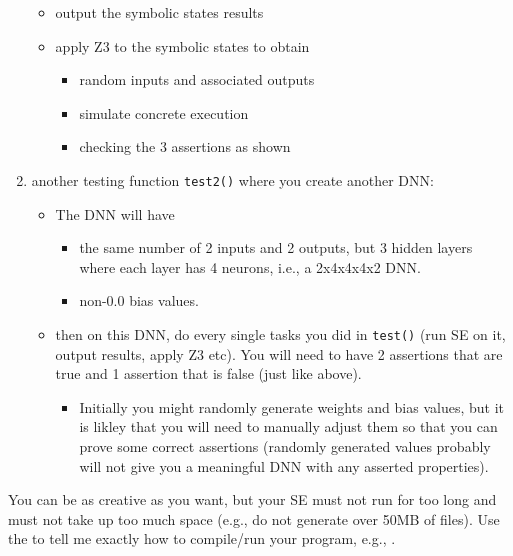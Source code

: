 \begin{enumerate}
\begin{itemize}
    \item output the symbolic states results
    \item apply Z3 to the symbolic states to obtain
        \begin{itemize}
        \item random inputs and associated outputs
        \item simulate concrete execution
        \item checking the 3 assertions as shown
        \end{itemize}
    \end{itemize}
\item another testing function \texttt{test2()} where you create another DNN:
    \begin{itemize}
    \item The DNN will have 
        \begin{itemize}
        \item the same number of 2 inputs and 2 outputs, but 3 hidden layers where each layer  has 4  neurons, i.e., a 2x4x4x4x2 DNN.
        \item non-0.0 bias values.
        \end{itemize}
    \item then on this DNN, do every single tasks you did in \texttt{test()}  (run SE on it, output results, apply Z3 etc).  You will need to have 2 assertions that are true and 1 assertion that is false (just like above).
        \begin{itemize}
        \item Initially you might randomly generate weights and bias values, but it is likley that you will need to manually adjust them so that you can prove some correct assertions (randomly generated values probably will not give you a meaningful DNN with any asserted properties).
        \end{itemize}
    \end{itemize}
\end{enumerate}


You can be as creative as you want, but your SE must not run for too long and must not take up too much space (e.g., do not generate over 50MB of files).  Use the  to tell me exactly how to compile/run your program, e.g., .

